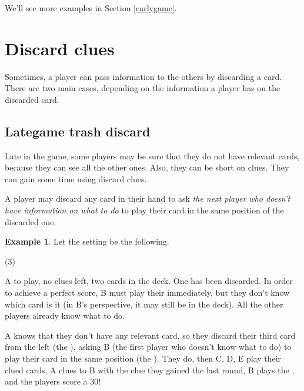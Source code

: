 \documentclass[a4paper]{article}
\theoremstyle{plain}
\theoremstyle{definition}
\newtheorem{example}[theorem]{Example}
\begin{document}
We'll see more examples in Section \ref{earlygame}.

\section{Discard clues}

Sometimes, a player can pass information to the others by discarding a card. There are two main cases, depending on the information a player has on the discarded card.

%
%

\subsection{Lategame trash discard}

Late in the game, some players may be sure that they do not have relevant cards, because they can see all the other ones. Also, they can be short on clues. They can gain some time using discard clues.

A player may discard any card in their hand to ask \textit{the next player who doesn't have information on what to do} to play their card in the same position of the discarded one.

\begin{example}
	
	Let the setting be the following.
	
	\begin{tasks}(3)
		\task[+]      
		\task[A]    
		\task[B]    
		\task[C]    
		\task[D]    
		\task[E]    
	\end{tasks}
	
	A to play, no clues left, two cards in the deck. One  has been discarded. In order to achieve a perfect score, B must play their  immediately, but they don't know which card is it (in B's perspective, it may still be in the deck). All the other players already know what to do.
	
	A knows that they don't have any relevant card, so they discard their third card from the left (the ), asking B (the first player who doesn't know what to do) to play their card in the same position (the ). They do, then C, D, E play their clued cards, A clues  to B with the clue they gained the last round, B plays the , and the players score a 30!
\end{example}
\end{document}
